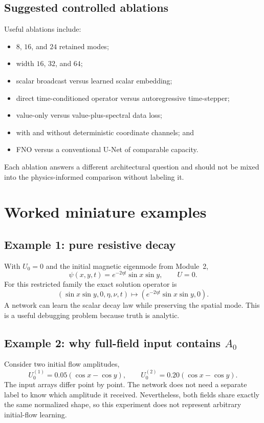 \documentclass[11pt]{article}
\begin{document}
\subsection{Suggested controlled ablations}
Useful ablations include:
\begin{itemize}
  \item $8$, $16$, and $24$ retained modes;
  \item width $16$, $32$, and $64$;
  \item scalar broadcast versus learned scalar embedding;
  \item direct time-conditioned operator versus autoregressive time-stepper;
  \item value-only versus value-plus-spectral data loss;
  \item with and without deterministic coordinate channels; and
  \item FNO versus a conventional U-Net of comparable capacity.
\end{itemize}
Each ablation answers a different architectural question and should not be mixed into the physics-informed comparison without labeling it.

\section{Worked miniature examples}
\label{sec:examples}

\subsection{Example 1: pure resistive decay}
With $U_0=0$ and the initial magnetic eigenmode from Module~2,
\[
\psi(x,y,t)=e^{-2\eta t}\sin x\sin y,\qquad U=0.
\]
For this restricted family the exact solution operator is
\[
(\sin x\sin y,0,\eta,\nu,t)
\mapsto
(e^{-2\eta t}\sin x\sin y,0).
\]
A network can learn the scalar decay law while preserving the spatial mode. This is a useful debugging problem because truth is analytic.

\subsection{Example 2: why full-field input contains $A_0$}
Consider two initial flow amplitudes,
\[
U_0^{(1)}=0.05(\cos x-\cos y),\qquad
U_0^{(2)}=0.20(\cos x-\cos y).
\]
The input arrays differ point by point. The network does not need a separate label to know which amplitude it received. Nevertheless, both fields share exactly the same normalized shape, so this experiment does not represent arbitrary initial-flow learning.
\end{document}
